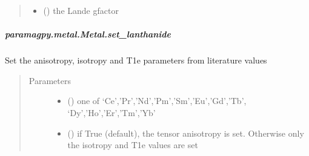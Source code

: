 \documentclass[a4paper,10pt,english,openany,oneside]{sphinxmanual}
\begin{document}
\begin{fulllineitems}
\begin{fulllineitems}
\begin{fulllineitems}
\begin{quote}
\begin{description}
\begin{itemize}
\item {} 
\sphinxAtStartPar
{} (\sphinxstyleliteralemphasis{\sphinxupquote{, }}) \textendash{} the Lande g\sphinxhyphen{}factor

\end{itemize}

\end{description}\end{quote}

\end{fulllineitems}



\subparagraph{paramagpy.metal.Metal.set\_lanthanide}
\label{\detokenize{reference/generated/paramagpy.metal.Metal.set_lanthanide:paramagpy-metal-metal-set-lanthanide}}\label{\detokenize{reference/generated/paramagpy.metal.Metal.set_lanthanide::doc}}

\begin{fulllineitems}
\label{\detokenize{reference/generated/paramagpy.metal.Metal.set_lanthanide:paramagpy.metal.Metal.set_lanthanide}}
\sphinxAtStartPar
Set the anisotropy, isotropy and T1e parameters from
literature values
\begin{quote}\begin{description}
\item[{Parameters}] \leavevmode\begin{itemize}
\item {} 
\sphinxAtStartPar
{} () \textendash{} one of ‘Ce’,’Pr’,’Nd’,’Pm’,’Sm’,’Eu’,’Gd’,’Tb’,
‘Dy’,’Ho’,’Er’,’Tm’,’Yb’

\item {} 
\sphinxAtStartPar
{} (\sphinxstyleliteralemphasis{\sphinxupquote{ (}}\sphinxstyleliteralemphasis{\sphinxupquote{)}}) \textendash{} if True (default), the tensor anisotropy is set.
Otherwise only the isotropy and T1e values are set


\end{itemize}
\end{description}
\end{quote}
\end{fulllineitems}
\end{fulllineitems}
\end{fulllineitems}
\end{document}
